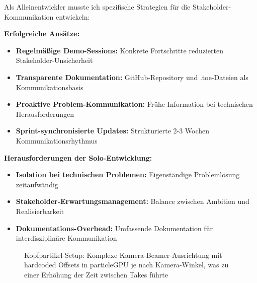 \raggedright Als Alleinentwickler musste ich spezifische Strategien für die Stakeholder-Kommunikation entwickeln:

\textbf{Erfolgreiche Ansätze:}
\begin{itemize}
\item \textbf{Regelmäßige Demo-Sessions:} Konkrete Fortschritte reduzierten Stakeholder-Unsicherheit
\item \textbf{Transparente Dokumentation:} GitHub-Repository und .toe-Dateien als Kommunikationsbasis
\item \textbf{Proaktive Problem-Kommunikation:} Frühe Information bei technischen Herausforderungen
\item \textbf{Sprint-synchronisierte Updates:} Strukturierte 2-3 Wochen Kommunikationsrhythmus
\end{itemize}

\textbf{Herausforderungen der Solo-Entwicklung:}
\begin{itemize}
\item \textbf{Isolation bei technischen Problemen:} Eigenständige Problemlösung zeitaufwändig
\item \textbf{Stakeholder-Erwartungsmanagement:} Balance zwischen Ambition und Realisierbarkeit
\item \textbf{Dokumentations-Overhead:} Umfassende Dokumentation für interdisziplinäre Kommunikation
\end{itemize}

\begin{figure}[htbp]
    \centering
    \caption{Kopfpartikel-Setup: Komplexe Kamera-Beamer-Ausrichtung mit hardcoded Offsets in particleGPU je nach Kamera-Winkel, was zu einer Erhöhung der Zeit zwischen Takes führte}
    \label{fig:head_setup}
\end{figure}

